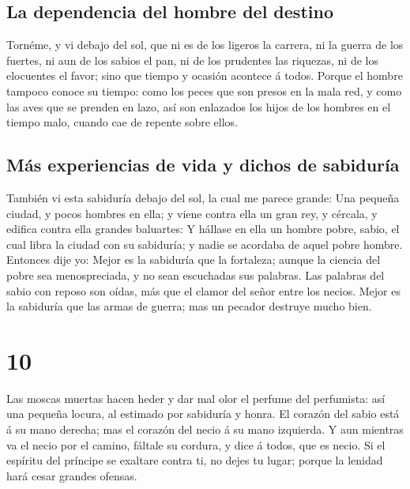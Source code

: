\hypertarget{la-dependencia-del-hombre-del-destino}{%
\subsection{La dependencia del hombre del
destino}\label{la-dependencia-del-hombre-del-destino}}

 Tornéme, y vi debajo del sol, que ni es de los ligeros
la carrera, ni la guerra de los fuertes, ni aun de los sabios el pan, ni
de los prudentes las riquezas, ni de los elocuentes el favor; sino que
tiempo y ocasión acontece á todos.  Porque el hombre
tampoco conoce su tiempo: como los peces que son presos en la mala red,
y como las aves que se prenden en lazo, así son enlazados los hijos de
los hombres en el tiempo malo, cuando cae de repente sobre ellos.

\hypertarget{muxe1s-experiencias-de-vida-y-dichos-de-sabiduruxeda}{%
\subsection{Más experiencias de vida y dichos de
sabiduría}\label{muxe1s-experiencias-de-vida-y-dichos-de-sabiduruxeda}}

 También vi esta sabiduría debajo del sol, la cual me
parece grande:  Una pequeña ciudad, y pocos hombres en
ella; y viene contra ella un gran rey, y cércala, y edifica contra ella
grandes baluartes:  Y hállase en ella un hombre pobre,
sabio, el cual libra la ciudad con su sabiduría; y nadie se acordaba de
aquel pobre hombre.  Entonces dije yo: Mejor es la
sabiduría que la fortaleza; aunque la ciencia del pobre sea
menospreciada, y no sean escuchadas sus palabras.  Las
palabras del sabio con reposo son oídas, más que el clamor del señor
entre los necios.  Mejor es la sabiduría que las armas de
guerra; mas un pecador destruye mucho bien.

\hypertarget{section-9}{%
\section{10}\label{section-9}}

 Las moscas muertas hacen heder y dar mal olor el perfume
del perfumista: así una pequeña locura, al estimado por sabiduría y
honra.  El corazón del sabio está á su mano derecha; mas
el corazón del necio á su mano izquierda.  Y aun mientras
va el necio por el camino, fáltale su cordura, y dice á todos, que es
necio.  Si el espíritu del príncipe se exaltare contra ti,
no dejes tu lugar; porque la lenidad hará cesar grandes ofensas.

